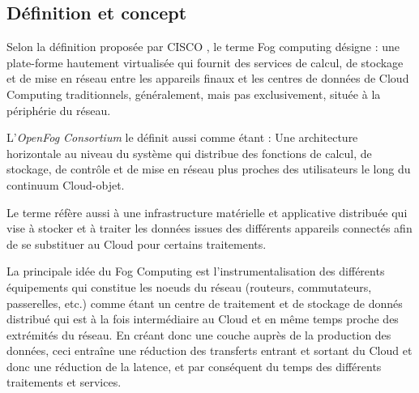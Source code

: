 \subsection{Définition et concept}
Selon la définition proposée par CISCO \cite{bonomi2012}, le terme Fog computing désigne : \og{}une plate-forme hautement virtualisée qui fournit des services de calcul, de stockage et de mise en réseau entre les appareils finaux et les centres de données de Cloud Computing traditionnels, généralement, mais pas exclusivement, située à la périphérie du réseau\fg{}.\par
L'\emph{OpenFog Consortium} \cite{OpenFog2017} le définit aussi comme étant : \og{} Une architecture horizontale au niveau du système qui distribue des fonctions de calcul, de stockage, de contrôle et de mise en réseau plus proches des utilisateurs le long du continuum Cloud-objet\fg{}.\par
Le terme réfère aussi à une infrastructure matérielle et applicative distribuée qui vise à stocker et à traiter les données issues des différents appareils connectés afin de se substituer au Cloud pour certains traitements.\par
La principale idée du Fog Computing est l'instrumentalisation des différents équipements qui constitue les noeuds du réseau (routeurs, commutateurs, passerelles, etc.) comme étant un centre de traitement et de stockage de donnés distribué qui est à la fois intermédiaire au Cloud et en même temps proche des extrémités du réseau.
En créant donc une couche auprès de la production des données, ceci entraîne une réduction des transferts entrant et sortant du Cloud et donc une réduction de la latence, et par conséquent du temps des différents traitements et services.

